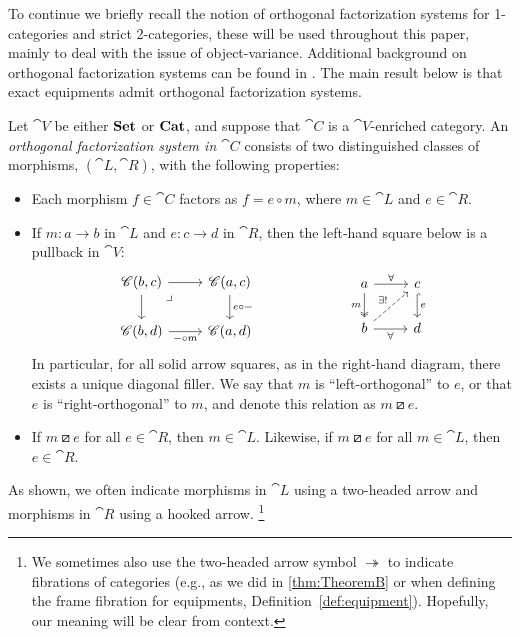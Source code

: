 \documentclass[11pt,oneside,article]{memoir}
\begin{document}
To continue we briefly recall the notion of orthogonal factorization systems for 1-categories and strict 2-categories, these will be used throughout this paper, mainly to deal with the issue of object-variance. Additional background on orthogonal factorization systems can be found in \cite[Chapter 5.5]{BorceuxV1}. The main result below is that exact equipments admit orthogonal factorization systems. 
\begin{definition}
      \label{def:orthogonal}
   Let $\cat{V}$ be either $\mathbf{Set}$ or $\mathbf{Cat}$, and suppose that $\cat{C}$ is a $\cat{V}$-enriched
   category. An \emph{orthogonal factorization system in $\cat{C}$} consists of two distinguished
   classes of morphisms, $(\cat{L},\cat{R})$, with the following properties:
   \begin{itemize}
      \item Each morphism $f\in\cat{C}$ factors as $f=e\circ m$, where $m\in\cat{L}$ and
         $e\in\cat{R}$.
      \item If $m\colon a\to b$ in $\cat{L}$ and $e\colon c\to d$ in $\cat{R}$, then the left-hand
         square below is a pullback in $\cat{V}$:
         \begin{equation}
               \label{eqn:OrthFactSys}
            \begin{tikzcd}
               \cat{C}(b,c)\ar[r]\ar[d]\ar[rd,phantom,"\lrcorner" very near start]&\cat{C}(a,c)\ar[d,"e\circ -"]\\
               \cat{C}(b,d)\ar[r,"-\circ m"']&\cat{C}(a,d)
            \end{tikzcd}
            \hspace{.9in}
            \begin{tikzcd}
               a\ar[r,"\forall"]\ar[d,two heads,"m"']&c\ar[d,hook, "e"]\\
               b\ar[r,"\forall"']\ar[ur,dashed,"\exists!"]&d
            \end{tikzcd}
         \end{equation}
         In particular, for all solid arrow squares, as in the right-hand diagram, there exists a
         unique diagonal filler. We say that $m$ is ``left-orthogonal'' to $e$, or that $e$ is
         ``right-orthogonal'' to $m$, and denote this relation as $m\boxslash e$.
      \item If $m\boxslash e$ for all $e\in\cat{R}$, then $m\in\cat{L}$. Likewise, if $m\boxslash e$
         for all $m\in\cat{L}$, then $e\in\cat{R}$.
   \end{itemize}
   As shown, we often indicate morphisms in $\cat{L}$ using a two-headed arrow and morphisms in
   $\cat{R}$ using a hooked arrow.%
\footnote{
   We sometimes also use the two-headed arrow symbol $\twoheadrightarrow$
   to indicate fibrations of categories (e.g., as we did in \ref{thm:TheoremB} or
   when defining the frame fibration for equipments, Definition~\ref{def:equipment}). Hopefully,
   our meaning will be clear from context.
}

   
\end{definition}
\end{document}
